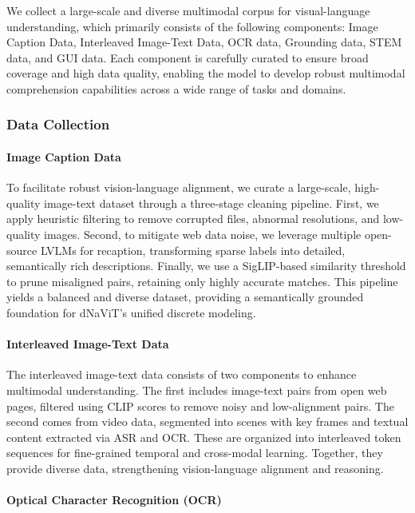 \documentclass{article}
\begin{document}
We collect a large-scale and diverse multimodal corpus  for visual-language understanding, which primarily consists of the following components: Image Caption Data, Interleaved Image-Text Data, OCR data, Grounding data, STEM data, and GUI data. Each component is carefully curated to ensure broad coverage and high data quality, enabling the model to develop robust multimodal comprehension capabilities across a wide range of tasks and domains.

\subsubsection{Data Collection}

\paragraph{Image Caption Data} 
To facilitate robust vision-language alignment, we curate a large-scale, high-quality image-text dataset through a three-stage cleaning pipeline. First, we apply heuristic filtering to remove corrupted files, abnormal resolutions, and low-quality images. Second, to mitigate web data noise, we leverage multiple open-source LVLMs for recaption, transforming sparse labels into detailed, semantically rich descriptions. Finally, we use a SigLIP-based similarity threshold to prune misaligned pairs, retaining only highly accurate matches. This pipeline yields a balanced and diverse dataset, providing a semantically grounded foundation for dNaViT’s unified discrete modeling.


\paragraph{Interleaved Image-Text Data}
The interleaved image-text data consists of two components to enhance multimodal understanding. The first includes image-text pairs from open web pages, filtered using CLIP scores to remove noisy and low-alignment pairs. The second comes from video data, segmented into scenes with key frames and textual content extracted via ASR and OCR. These are organized into interleaved token sequences for fine-grained temporal and cross-modal learning. Together, they provide diverse data, strengthening vision-language alignment and reasoning.



\paragraph{Optical Character Recognition (OCR)}
\end{document}
